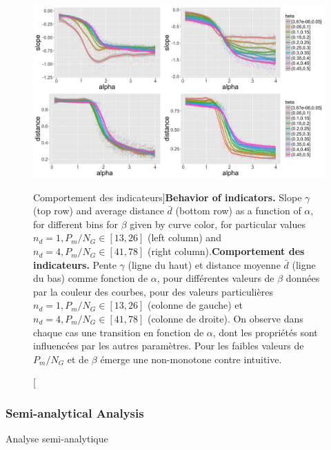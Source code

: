 \begin{figure}
\includegraphics[width=\linewidth]{Figures/Final/5-2-2-fig-density-fig3}
\caption[Behavior of indicators][Comportement des indicateurs]{\textbf{Behavior of indicators.} Slope $\gamma$ (top row) and average distance $\bar{d}$ (bottom row) as a function of $\alpha$, for different bins for $\beta$ given by curve color, for particular values $n_d=1,P_m/N_G\in\left[13,26\right]$ (left column) and $n_d=4,P_m/N_G\in\left[41,78\right]$ (right column).\label{fig:density:fig3}}{\textbf{Comportement des indicateurs.} Pente $\gamma$ (ligne du haut) et distance moyenne $\bar{d}$ (ligne du bas) comme fonction de $\alpha$, pour différentes valeurs de $\beta$ données par la couleur des courbes, pour des valeurs particulières $n_d=1,P_m/N_G\in\left[13,26\right]$ (colonne de gauche) et $n_d=4,P_m/N_G\in\left[41,78\right]$ (colonne de droite). On observe dans chaque cas une transition en fonction de $\alpha$, dont les propriétés sont influencées par les autres paramètres. Pour les faibles valeurs de $P_m/N_G$ et de $\beta$ émerge une non-monotone contre intuitive.\label{fig:density:fig3}}
\end{figure}






\subsubsection{Semi-analytical Analysis}{Analyse semi-analytique}


